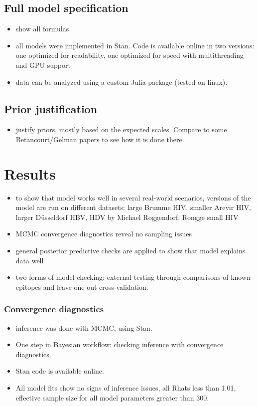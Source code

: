 \documentclass[fleqn,11pt]{SelfArx} %
\begin{document}
\subsection*{Full model specification}
\begin{itemize}
  \item show all formulas
  \item all models were implemented in Stan. Code is available online in two versions: one optimized for readability, one optimized for speed with multithreading and GPU support
  \item data can be analyzed using a custom Julia package (tested on linux).
\end{itemize}

\subsection*{Prior justification}
\begin{itemize}
  \item justify priors, mostly based on the expected scales. Compare to some 
  Betancourt/Gelman papers to see how it is done there.
\end{itemize}

\section{Results} \label{sec:results}

\begin{itemize}
  \item to show that model works well in several real-world scenarios, versions of the model are run on different datasets: large Brumme HIV, smaller Arevir HIV, larger Düsseldorf HBV, HDV by Michael Roggendorf, Rongge small HIV
  \item MCMC convergence diagnostics reveal no sampling issues
  \item general posterior predictive checks are applied to show that model explains data well
  \item two forms of model checking: external testing through comparisons of known epitopes and leave-one-out cross-validation.
\end{itemize}

\subsubsection*{Convergence diagnostics}

\begin{itemize}
  \item inference was done with MCMC, using Stan.
  \item One step in Bayesian workflow: checking inference with convergence diagnostics.
  \item Stan code is available online.
  \item All model fits show no signs of inference issues, all Rhats less than 1.01,
    effective sample size for all model parameters greater than 300.
\end{itemize}
\end{document}
